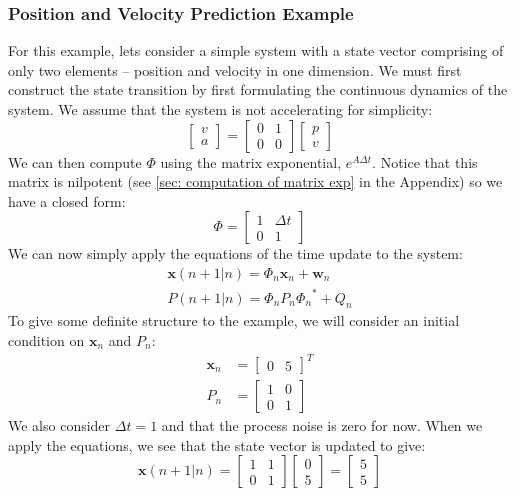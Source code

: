 \subsubsection{Position and Velocity Prediction Example}
For this example, lets consider a simple system with a state vector comprising of only two elements -- position and velocity in one dimension. We must first construct the state transition by first formulating the continuous dynamics of the system. We assume that the system is not accelerating for simplicity:
$$\begin{bmatrix}
    v\\a
\end{bmatrix}=\begin{bmatrix}
    0&1\\0&0
\end{bmatrix}\begin{bmatrix}
    p\\v
\end{bmatrix}$$
We can then compute $\Phi$ using the matrix exponential, $e^{A\Delta t}$. Notice that this matrix is nilpotent (see \autoref{sec: computation of matrix exp} in the Appendix) so we have a closed form:
$$\Phi=\begin{bmatrix}
    1&\Delta t\\0&1
\end{bmatrix}$$
We can now simply apply the equations of the time update to the system:
\begin{gather}
    \bm{x}(n+1|n)=\Phi_n\bm{x}_n+\bm{w}_n\\
    P(n+1|n)=\Phi_{n}P_{n}{\Phi_{n}}^*+Q_{n}
\end{gather}
To give some definite structure to the example, we will consider an initial condition on $\bm{x}_{n}$ and $P_{n}$:
\begin{align}
        \bm{x}_n&=\begin{bmatrix}
            0&5
        \end{bmatrix}^T\\
    P_n&=\begin{bmatrix}
        1&0\\0&1
    \end{bmatrix}
\end{align}
We also consider $\Delta t=1$ and that the process noise is zero for now. When we apply the equations, we see that the state vector is updated to give:
$$\bm{x}(n+1|n)=\begin{bmatrix}
    1&1\\0&1
\end{bmatrix}\begin{bmatrix}
            0\\5
        \end{bmatrix}=\begin{bmatrix}
            5\\5
        \end{bmatrix}$$
